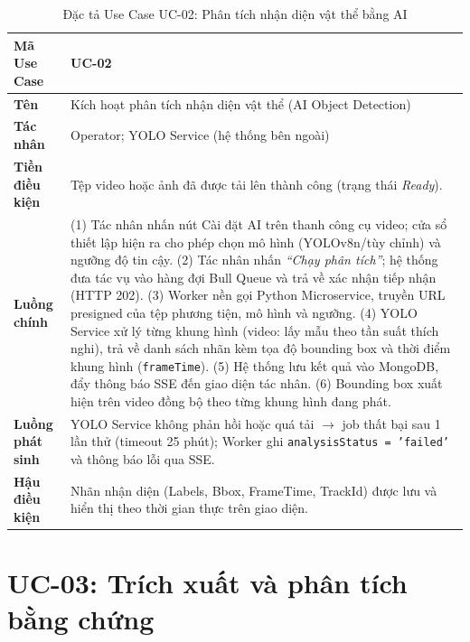 \documentclass[../DoAn.tex]{subfiles}
\begin{document}
\begin{longtable}{|p{3.5cm}|p{10.0cm}|}
\caption{Đặc tả Use Case UC-02: Phân tích nhận diện vật thể bằng AI}\label{tab:b-uc02}\\
\hline
\textbf{Mã Use Case} & UC-02 \\
\hline
\textbf{Tên} & Kích hoạt phân tích nhận diện vật thể (AI Object Detection) \\
\hline
\textbf{Tác nhân} & Operator; YOLO Service (hệ thống bên ngoài) \\
\hline
\textbf{Tiền điều kiện} & Tệp video hoặc ảnh đã được tải lên thành công (trạng thái \textit{Ready}). \\
\hline
\textbf{Luồng chính} &
(1) Tác nhân nhấn nút Cài đặt AI trên thanh công cụ video; cửa sổ thiết lập hiện ra cho phép chọn mô hình (YOLOv8n/tùy chỉnh) và ngưỡng độ tin cậy. \newline
(2) Tác nhân nhấn \textit{``Chạy phân tích''}; hệ thống đưa tác vụ vào hàng đợi Bull Queue và trả về xác nhận tiếp nhận (HTTP 202). \newline
(3) Worker nền gọi Python Microservice, truyền URL presigned của tệp phương tiện, mô hình và ngưỡng. \newline
(4) YOLO Service xử lý từng khung hình (video: lấy mẫu theo tần suất thích nghi), trả về danh sách nhãn kèm tọa độ bounding box và thời điểm khung hình (\texttt{frameTime}). \newline
(5) Hệ thống lưu kết quả vào MongoDB, đẩy thông báo SSE đến giao diện tác nhân. \newline
(6) Bounding box xuất hiện trên video đồng bộ theo từng khung hình đang phát. \\
\hline
\textbf{Luồng phát sinh} & YOLO Service không phản hồi hoặc quá tải $\to$ job thất bại sau 1 lần thử (timeout 25 phút); Worker ghi \texttt{analysisStatus = 'failed'} và thông báo lỗi qua SSE. \\
\hline
\textbf{Hậu điều kiện} & Nhãn nhận diện (Labels, Bbox, FrameTime, TrackId) được lưu và hiển thị theo thời gian thực trên giao diện. \\
\hline
\end{longtable}

\section{UC-03: Trích xuất và phân tích bằng chứng}
\end{document}
